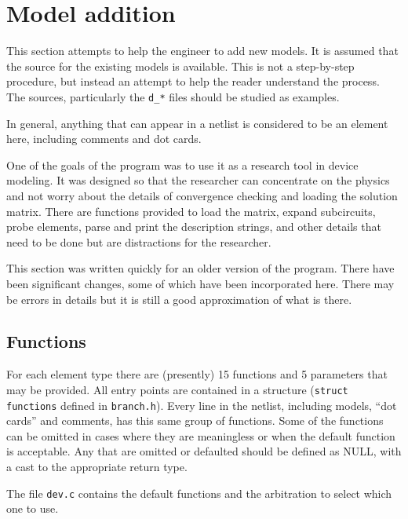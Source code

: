 \section{Model addition}

This section attempts to help the engineer to add new models.  It is assumed
that the source for the existing models is available.  This is not a
step-by-step procedure, but instead an attempt to help the reader understand
the process.  The sources, particularly the {\tt d\_*} files should be
studied as examples.

In general, anything that can appear in a netlist is considered to be an
element here, including comments and dot cards.

One of the goals of the program was to use it as a research tool in device
modeling.  It was designed so that the researcher can concentrate on the
physics and not worry about the details of convergence checking and loading
the solution matrix.  There are functions provided to load the matrix,
expand subcircuits, probe elements, parse and print the description strings,
and other details that need to be done but are distractions for the
researcher.

This section was written quickly for an older version of the program.
There have been significant changes, some of which have been incorporated here.  There may be errors in details but it is
still a good approximation of what is there.
\subsection{Functions}

For each element type there are (presently) 15 functions and 5 parameters that may be
provided.  All entry points are contained in a structure ({\tt struct
functions} defined in {\tt branch.h}).  Every line in the netlist, including
models, ``dot cards'' and comments, has this same group of functions.  Some
of the functions can be omitted in cases where they are meaningless or when the default function is acceptable.  Any
that are omitted or defaulted should be defined as NULL, with a cast to the appropriate
return type.

The file {\tt dev.c} contains the default functions and the arbitration to select which one to use.
